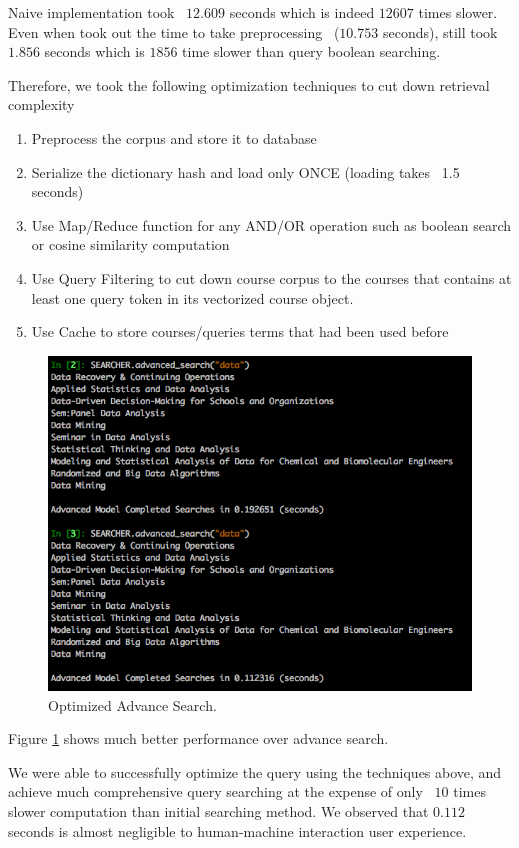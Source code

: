 \documentclass[twoside]{article}
\begin{document}
Naive implementation took ~$12.609$ seconds which is indeed $12607$ times slower. Even when took out the time to take preprocessing ~($10.753$ seconds), still took $1.856$ seconds which is $1856$ time slower than query boolean searching.

Therefore, we took the following optimization techniques to cut down retrieval complexity

\begin{enumerate}
\item Preprocess the corpus and store it to database
\item Serialize the dictionary hash and load only ONCE (loading takes ~1.5 seconds)
\item Use Map/Reduce function for any AND/OR operation such as boolean search or cosine similarity computation
\item Use Query Filtering to cut down course corpus to the courses that contains at least one query token in its vectorized course object.
\item Use Cache to store courses/queries terms that had been used before
\end{enumerate}

\begin{figure}
  \includegraphics[width=\linewidth]{Images/3.png}
  \caption{Optimized Advance Search.}
  \label{fig:optimized_advance_search}
\end{figure}
Figure \ref{fig:optimized_advance_search} shows much better performance over advance search.

We were able to successfully optimize the query using the techniques above, and achieve much comprehensive query searching at the expense of only ~$10$ times slower computation than initial searching method. We observed that $0.112$ seconds is almost negligible to human-machine interaction user experience.
\end{document}
